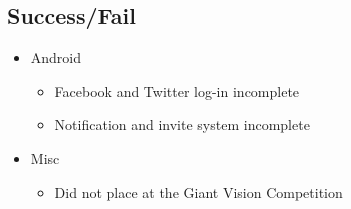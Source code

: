 \subsection{Success/Fail}
\begin{itemize}
	\item Android
	\begin{itemize}
		\item Facebook and Twitter log-in incomplete
		\item Notification and invite system incomplete
	\end{itemize}
	\item Misc
	\begin{itemize}
		\item Did not place at the Giant Vision Competition
	\end{itemize}
\end{itemize}

